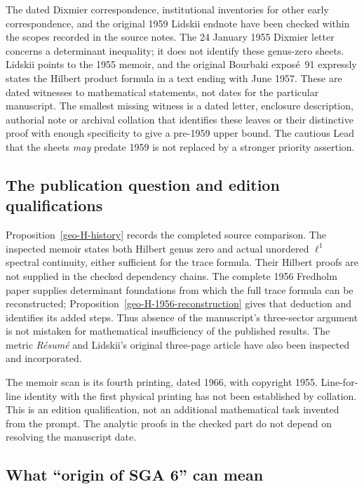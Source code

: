 The dated Dixmier correspondence, institutional inventories for other
early correspondence, and the original 1959 Lidskii endnote have
been checked within the scopes recorded in the source notes. The
24 January 1955 Dixmier letter concerns a determinant inequality;
it does not identify these genus-zero sheets. Lidskii points to the
1955 memoir, and the original Bourbaki expos\'e~91 expressly states
the Hilbert product formula in a text ending with June 1957. These
are dated witnesses to mathematical statements, not dates for the
particular manuscript. The smallest missing witness is a dated
letter, enclosure description, authorial note or archival collation
that identifies these leaves or their distinctive proof with enough
specificity to give a pre-1959 upper bound. The cautious Lead that
the sheets \emph{may} predate 1959 is not replaced by a stronger
priority assertion.

\subsection{The publication question and edition qualifications}

Proposition~\ref{geo-H-history} records the completed source comparison.
The inspected memoir states both Hilbert genus zero and actual
unordered $\ell^1$ spectral continuity, either sufficient for the
trace formula. Their Hilbert proofs are not supplied in the checked
dependency chains. The complete 1956 Fredholm paper supplies
determinant foundations from which the full trace formula can be
reconstructed; Proposition~\ref{geo-H-1956-reconstruction} gives that
deduction and identifies its added steps. Thus absence of the
manuscript's three-sector argument is not mistaken for mathematical
insufficiency of the published results. The metric \emph{R\'esum\'e}
and Lidskii's original three-page article have also been inspected
and incorporated.

The memoir scan is its fourth printing, dated 1966, with copyright
1955. Line-for-line identity with the first physical printing has
not been established by collation. This is an edition qualification,
not an additional mathematical task invented from the prompt.
The analytic proofs in the checked part do not depend on resolving
the manuscript date.

\subsection{What ``origin of SGA 6'' can mean}

